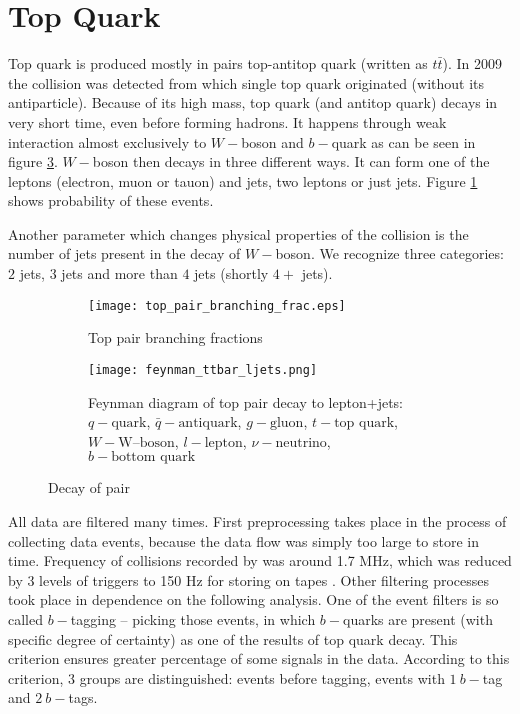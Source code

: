 \section{Top Quark}
Top quark is produced mostly in pairs top-antitop quark (written as $t\bar{t}$). In 2009 the collision was detected from which single top quark originated  (without its antiparticle). Because of its high mass, top quark (and antitop quark) decays in very short time, even before forming hadrons. It happens through weak interaction almost exclusively to $W-$boson and $b-$quark as can be seen in figure \ref{fig:feynman-ljets}. $W-$boson then decays in three different ways. It can form one of the leptons (electron, muon or tauon) and jets, two leptons or just jets. Figure \ref{fig:ttbarBranchingFrac} shows probability of these events. 

Another parameter which changes physical properties of the collision is the number of jets present in the decay of $W-$boson. We recognize three categories: $2$ jets, $3$ jets and more than $4$ jets (shortly $4+$ jets).

\begin{figure}[h]
  \centering
  \begin{subfigure}{.55	\textwidth}\centering
    \texttt{[image: top\_pair\_branching\_frac.eps]}
    \caption{Top pair branching fractions}
    \label{fig:ttbarBranchingFrac}
  \end{subfigure}\hspace{3mm}
  \begin{subfigure}{.4\textwidth}\centering
    \texttt{[image: feynman\_ttbar\_ljets.png]}
    \caption{Feynman diagram of top pair decay to lepton+jets: 
    $q - \text{quark}$,
    $\bar{q} - \text{antiquark}$,
	$g - \text{gluon}$,
	$t - \text{top quark}$,
    $W - \text{W--boson}$,
    $l - \text{lepton}$,
    $\nu - \text{neutrino}$,
    $b - \text{bottom quark}$ \cite{Heinson}}
   	\label{fig:feynman-ljets}
  \end{subfigure}
  \caption{Decay of \ttbar pair}
\end{figure} 

All data are filtered many times. First preprocessing takes  place in the process of collecting data events, because the data flow was simply too large to store in time. Frequency of collisions recorded by \dzero was around 1.7 MHz, which was reduced by 3 levels of triggers to 150 Hz for storing on tapes \cite{Yuntse}. Other filtering processes took place in dependence on the following analysis. One of the event filters is so called $b-$tagging -- picking those events, in which $b-$quarks are present (with specific degree of certainty) as one of the results of top quark decay. This criterion ensures greater percentage of some signals in the data. According to this criterion, 3 groups are distinguished: events before tagging, events with $1\: b-$tag and $2\: b-$tags.

